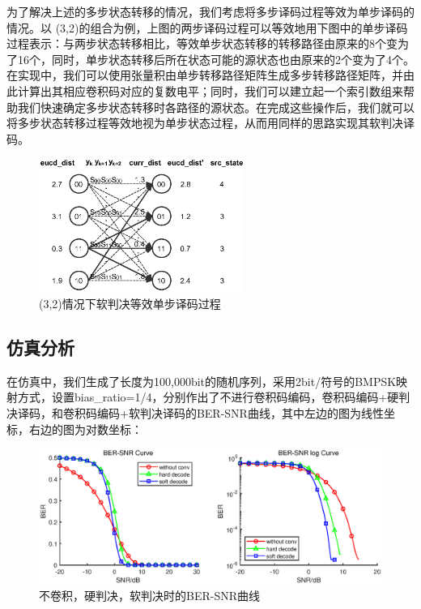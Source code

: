 为了解决上述的多步状态转移的情况，我们考虑将多步译码过程等效为单步译码的情况。以 (3,2)的组合为例，上图的两步译码过程可以等效地用下图中的单步译码过程表示：与两步状态转移相比，等效单步状态转移的转移路径由原来的8个变为了16个，同时，单步状态转移后所在状态可能的源状态也由原来的2个变为了4个。在实现中，我们可以使用张量积由单步转移路径矩阵生成多步转移路径矩阵，并由此计算出其相应卷积码对应的复数电平；同时，我们可以建立起一个索引数组来帮助我们快速确定多步状态转移时各路径的源状态。在完成这些操作后，我们就可以将多步状态转移过程等效地视为单步状态过程，从而用同样的思路实现其软判决译码。

\begin{figure}[h]
    \centering
    \includegraphics[width=0.6\textwidth,trim=0 40 0 40,clip]{pic/2-3-3.eps}
    \caption{(3,2)情况下软判决等效单步译码过程}
\end{figure}

\subsection{仿真分析}

在仿真中，我们生成了长度为100,000bit的随机序列，采用2bit/符号的BMPSK映射方式，设置bias\_ratio=1/4，分别作出了不进行卷积码编码，卷积码编码+硬判决译码，和卷积码编码+软判决译码的BER-SNR曲线，其中左边的图为线性坐标，右边的图为对数坐标：

\begin{figure}[h]
    \centering
    \includegraphics[width=\textwidth]{pic/2-3-4.eps}
    \caption{不卷积，硬判决，软判决时的BER-SNR曲线}
\end{figure}

